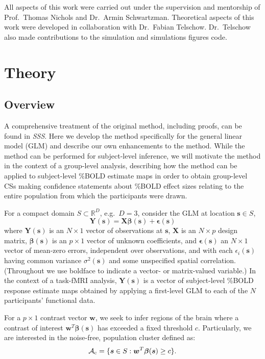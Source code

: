 All aspects of this work were carried out under the supervision and mentorship of Prof.\ Thomas Nichols and Dr.\ Armin Schwartzman. Theoretical aspects of this work were developed in collaboration with Dr.\ Fabian Telschow. Dr.\ Telschow also made contributions to the simulation and simulations figures code. 

\section{Theory}

\subsection{Overview}
\label{sec:Overview}
A comprehensive treatment of the original method, including proofs, can be found in \textit{SSS}.  Here we develop the method specifically for the general linear model (GLM) and describe our own enhancements to the method. While the method can be performed for subject-level inference, we will motivate the method in the context of a group-level analysis, describing how the method can be applied to subject-level \%BOLD estimate maps in order to obtain group-level CSs making confidence statements about \%BOLD effect sizes relating to the entire population from which the participants were drawn.

For a compact domain $S \subset \mathbb{R}^{D}$, e.g.~$D=3$, consider the GLM at location $\bm{s} \in S$,
\begin{equation}
\label{eq:CI_GLM}
\bm{Y}(\bm{s}) = \bm{X}\bm{\beta}(\bm{s}) + \bm{\epsilon}(\bm{s})	
\end{equation}
where $\bm{Y}(\bm{s})$ is an $N \times 1$ vector of observations at  $\bm{s}$, $\bm{X}$ is an $N \times p$ design matrix, $\bm{\beta}(\bm{s})$ is an $p \times 1$ vector of unknown coefficients, and $\bm{\epsilon}(\bm{s})$ an $N \times 1$ vector of mean-zero errors, independent over observations, and with each $\epsilon_i(\bm{s})$ having common variance $\sigma^2(\bm{s})$ and some unspecified spatial correlation. (Throughout we use boldface to indicate a vector- or matrix-valued variable.) In the context of a  task-fMRI analysis, $\bm{Y}(\bm{s})$ is a vector of subject-level \%BOLD response estimate maps obtained by applying a first-level GLM to each of the $N$ participants' functional data. 

For a $p \times 1$ contrast vector $\bm{w}$, we seek to infer regions of the brain where a contrast of interest $\bm{w}^{T}\bm{\beta}(\bm{s})$ has exceeded a fixed threshold  $c$. Particularly, we are interested in the noise-free, population cluster defined as: 
\begin{equation}
\label{eq:CI_excursion}
\operatorname{\mathcal{A}_{c}} = \{\bm{s} \in S : \bm{w}^{T}\bm{\beta}(\bm{s}) \geq c \}.
\end{equation}

